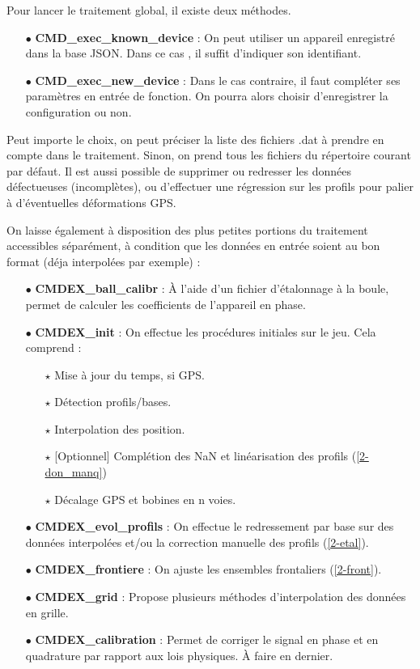 \documentclass[12pt]{article}
\begin{document}
    Pour lancer le traitement global, il existe deux méthodes.
    \begin{enumerate}
        \item[$\bullet$] \textbf{CMD\_exec\_known\_device} : On peut utiliser un appareil enregistré dans la base JSON. Dans ce cas , il suffit d'indiquer son identifiant.
        \item[$\bullet$] \textbf{CMD\_exec\_new\_device} : Dans le cas contraire, il faut compléter ses paramètres en entrée de fonction. On pourra alors choisir d'enregistrer la configuration ou non.
    \end{enumerate}
    
    Peut importe le choix, on peut préciser la liste des fichiers .dat à prendre en compte dans le traitement. Sinon, on prend tous les fichiers du répertoire courant par défaut. Il est aussi possible de supprimer ou redresser les données défectueuses (incomplètes), ou d'effectuer une régression sur les profils pour palier à d'éventuelles déformations GPS.

    On laisse également à disposition des plus petites portions du traitement accessibles séparément, à condition que les données en entrée soient au bon format (déja interpolées par exemple) :

    \begin{enumerate}
        \item[$\bullet$] \textbf{CMDEX\_ball\_calibr} : À l'aide d'un fichier d'étalonnage à la boule, permet de calculer les coefficients de l'appareil en phase.
        \item[$\bullet$] \textbf{CMDEX\_init} : On effectue les procédures initiales sur le jeu. Cela comprend :
        \begin{enumerate}
            \item[$\star$] Mise à jour du temps, si GPS.
            \item[$\star$] Détection profils/bases.
            \item[$\star$] Interpolation des position.
            \item[$\star$] [Optionnel] Complétion des NaN et linéarisation des profils (\ref{2-don_manq})
            \item[$\star$] Décalage GPS et bobines en n voies.
        \end{enumerate}
        \item[$\bullet$] \textbf{CMDEX\_evol\_profils} : On effectue le redressement par base sur des données interpolées et/ou la correction manuelle des profils (\ref{2-etal}).
        \item[$\bullet$] \textbf{CMDEX\_frontiere} : On ajuste les ensembles frontaliers (\ref{2-front}).
        \item[$\bullet$] \textbf{CMDEX\_grid} : Propose plusieurs méthodes d'interpolation des données en grille.
        \item[$\bullet$] \textbf{CMDEX\_calibration} : Permet de corriger le signal en phase et en quadrature par rapport aux lois physiques. À faire en dernier.
    \end{enumerate}
    
\end{document}
